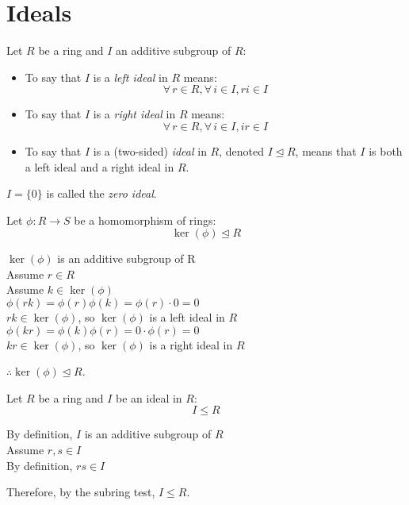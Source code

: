 \documentclass[letterpaper,12pt,fleqn]{article}
\newcommand{\ide}{\trianglelefteq}
\begin{document}
\section*{Ideals}

\begin{definition}
  Let $R$ be a ring and $I$ an additive subgroup of $R$:
  \begin{itemize}
  \item To say that $I$ is a \emph{left ideal} in $R$ means:
    \[\forall\,r\in R,\forall\,i\in I,ri\in I\]
  \item To say that $I$ is a \emph{right ideal} in $R$ means:
    \[\forall\,r\in R,\forall\,i\in I,ir\in I\]
  \item To say that $I$ is a (two-sided) \emph{ideal} in $R$, denoted $I\ide R$, means
    that $I$ is both a left ideal and a right ideal in $R$.
  \end{itemize}
\end{definition}

\begin{definition}
  $I=\{0\}$ is called the \emph{zero ideal}.
\end{definition}    

\begin{theorem}
  Let $\phi:R\to S$ be a homomorphism of rings:
  \[\ker(\phi)\ide R\]
\end{theorem}

\begin{theproof}
  $\ker(\phi)$ is an additive subgroup of R \\
  Assume $r\in R$ \\
  Assume $k\in \ker(\phi)$ \\
  $\phi(rk)=\phi(r)\phi(k)=\phi(r)\cdot0=0$ \\
  $rk\in\ker(\phi)$, so $\ker(\phi)$ is a left ideal in $R$ \\
  $\phi(kr)=\phi(k)\phi(r)=0\cdot\phi(r)=0$ \\
  $kr\in\ker(\phi)$, so $\ker(\phi)$ is a right ideal in $R$

  $\therefore\ker(\phi)\ide R$.
\end{theproof}

\begin{theorem}
  Let $R$ be a ring and $I$ be an ideal in $R$:
  \[I\le R\]
\end{theorem}

\begin{theproof}
  By definition, $I$ is an additive subgroup of $R$ \\
  Assume $r,s\in I$ \\
  By definition, $rs\in I$

  Therefore, by the subring test, $I\le R$.
\end{theproof}
\end{document}

